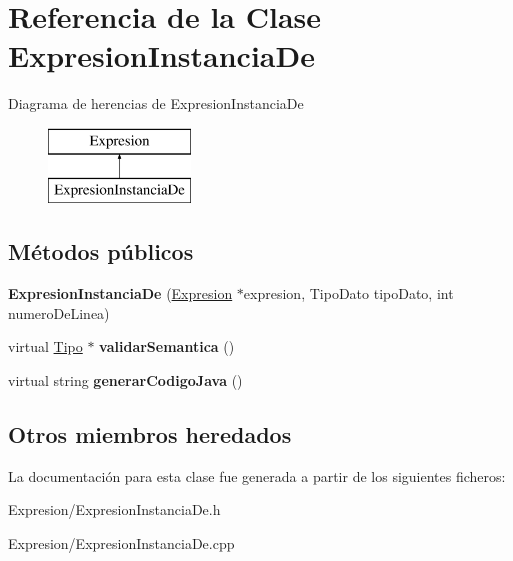 \hypertarget{class_expresion_instancia_de}{\section{Referencia de la Clase Expresion\-Instancia\-De}
\label{class_expresion_instancia_de}
}
Diagrama de herencias de Expresion\-Instancia\-De\begin{figure}[H]
\begin{center}
\leavevmode
\includegraphics[height=2.000000cm]{class_expresion_instancia_de}
\end{center}
\end{figure}
\subsection*{Métodos públicos}
\begin{DoxyCompactItemize}
\item 
\hypertarget{class_expresion_instancia_de_a901569629da3b94f17587a5e97a8d201}{{\bfseries Expresion\-Instancia\-De} (\hyperlink{class_expresion}{Expresion} $\ast$expresion, Tipo\-Dato tipo\-Dato, int numero\-De\-Linea)}\label{class_expresion_instancia_de_a901569629da3b94f17587a5e97a8d201}

\item 
\hypertarget{class_expresion_instancia_de_aa6383a6e850df716d09a5b306082014e}{virtual \hyperlink{class_tipo}{Tipo} $\ast$ {\bfseries validar\-Semantica} ()}\label{class_expresion_instancia_de_aa6383a6e850df716d09a5b306082014e}

\item 
\hypertarget{class_expresion_instancia_de_a74422da6614660d75a77a3a6011b9fcf}{virtual string {\bfseries generar\-Codigo\-Java} ()}\label{class_expresion_instancia_de_a74422da6614660d75a77a3a6011b9fcf}

\end{DoxyCompactItemize}
\subsection*{Otros miembros heredados}


La documentación para esta clase fue generada a partir de los siguientes ficheros\-:\begin{DoxyCompactItemize}
\item 
Expresion/Expresion\-Instancia\-De.\-h\item 
Expresion/Expresion\-Instancia\-De.\-cpp\end{DoxyCompactItemize}
